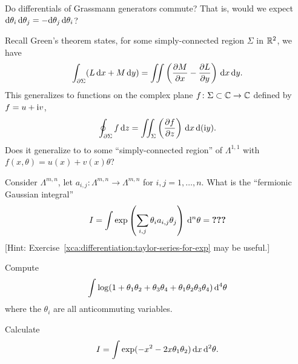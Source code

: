 \begin{exercise}
Do differentials of Grassmann generators commute? That is, would we
expect $\mathrm{d}\theta_{i}\,\mathrm{d}\theta_{j}=-\mathrm{d}\theta_{j}\,\mathrm{d}\theta_{i}$?
\end{exercise}

\begin{puzzle}
Recall Green's theorem states, for some simply-connected region $\Sigma$ in $\mathbb{R}^{2}$,
we have
\begin{equation}
\int_{\partial\Sigma}(L\,\mathrm{d} x+M\,\mathrm{d} y) = \iint\left(\frac{\partial M}{\partial x}-\frac{\partial L}{\partial y}\right)\,\mathrm{d} x\,\mathrm{d} y.
\end{equation}
This generalizes to functions on the complex plane $f\colon\Sigma\subset\mathbb{C}\to\mathbb{C}$
defined by $f=u+\mathrm{i} v$,
\begin{equation}
\oint_{\partial\Sigma}f\,\mathrm{d} z = \iint_{\Sigma}\left(\frac{\partial f}{\partial
  z}\right)\,\mathrm{d} x\,\mathrm{d}(\mathrm{i} y).
\end{equation}
Does it generalize to to some ``simply-connected region'' of
$\Lambda^{1,1}$ with $f(x,\theta)=u(x)+v(x)\theta$?
\end{puzzle}

\begin{puzzle}
Consider $\Lambda^{m,n}$, let
$a_{i,j}\colon\Lambda^{m,n}\to\Lambda^{m,n}$ for $i,j=1,\dots,n$.
What is the ``fermionic Gaussian integral''
\begin{equation}
I =
\int\exp\left(\sum_{i,j}\theta_{i}a_{i,j}\theta_{j}\right)\,\mathrm{d}^{n}\theta
= \hbox{\normalfont\bfseries???}
\end{equation}
[Hint: Exercise~\ref{xca:differentiation:taylor-series-for-exp} may be useful.]
\end{puzzle}



\begin{exercise}[A.~Schwarz 2008]
  Compute
  \begin{equation}
\int\log(1 + \theta_{1}\theta_{2} + \theta_{3}\theta_{4}
+ \theta_{1}\theta_{2}\theta_{3}\theta_{4})\,\mathrm{d}^{4}\theta
  \end{equation}
where the $\theta_{i}$ are all anticommuting variables.
\end{exercise}

\begin{exercise}[A.~Schwarz 2008]
  Calculate
  \begin{equation}
I = \int\exp(-x^{2}-2x\theta_{1}\theta_{2})\,\mathrm{d} x\,\mathrm{d}^{2}\theta.
  \end{equation}
\end{exercise}

